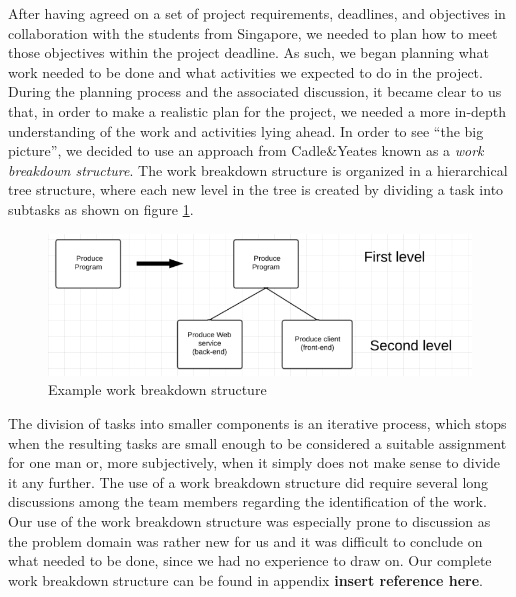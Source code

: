 After having agreed on a set of project requirements, deadlines, and objectives in collaboration with the students from Singapore, we needed to plan how to meet those objectives within the project deadline. As such, we began planning what work needed to be done and what activities we expected to do in the project.
During the planning process and the associated discussion, it became clear to us that, in order to make a realistic plan for the project, we needed a more in-depth understanding of the work and activities lying ahead. In order to see “the big picture”, we decided to use an approach from Cadle\&Yeates \cite{caye} known as a \emph{work breakdown structure}. The work breakdown structure is organized in a hierarchical tree structure, where each new level in the tree is created by dividing a task into subtasks as shown on figure \ref{fig:breakdown}.

\begin{figure}[hbtp]
	\label{fig:breakdown}
	\includegraphics[scale=0.5]{./Empiri/Planning/img/wbslevels.png}
	\caption{Example work breakdown structure} 
\end{figure}
The division of tasks into smaller components is an iterative process, which stops when the resulting tasks are small enough to be considered a suitable assignment for one man or, more subjectively, when it simply does not make sense to divide it any further.
The use of a work breakdown structure did require several long discussions among the team members regarding the identification of the work. Our use of the work breakdown structure was especially prone to discussion as the problem domain was rather new for us and it was difficult to conclude on what needed to be done, since we had no experience to draw on.
Our complete work breakdown structure can be found in appendix \textbf{insert reference here}.

